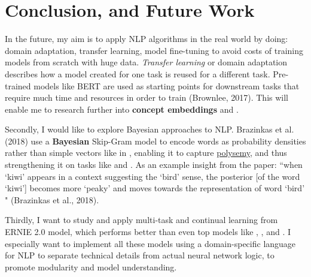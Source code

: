 \section{Conclusion, and Future Work}\label{sec:ConcludeAndFuture}


In the future, my aim is to apply NLP algorithms in the real world by doing: domain adaptation, transfer learning, model fine-tuning to avoid costs of training models from scratch with huge data. \emph{Transfer learning} or domain adaptation describes how a model created for one task is reused for a different task. Pre-trained models like BERT are used as starting points for downstream tasks that require much time and resources in order to train (Brownlee, 2017). This will enable me to research further into \textbf{concept embeddings} and . 

Secondly, I would like to explore Bayesian approaches to NLP. Brazinkas et al. (2018) use a \textbf{Bayesian} Skip-Gram model to encode words as probability densities rather than simple vectors like in , enabling it to capture \hyperref[sec:Polysemy]{polysemy}, and thus strengthening it on tasks like  and . As an example insight from the paper: ``when `kiwi' appears in a context suggesting the ‘bird’ sense, the posterior [of the word `kiwi'] becomes more ‘peaky’ and moves towards the representation of word ‘bird’ " (Brazinkas et al., 2018). 



Thirdly, I want to study and apply multi-task and continual learning from ERNIE 2.0 model, which performs better than even top models like , , and . I especially want to implement all these models using a domain-specific language for NLP to separate technical details from actual neural network logic, to promote modularity and model understanding. 